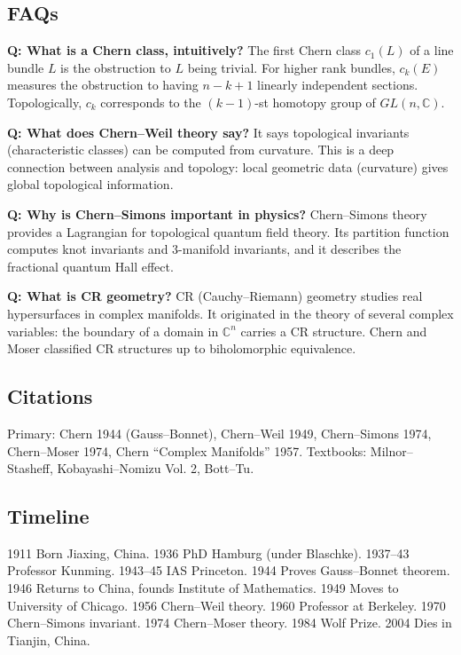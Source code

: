 \subsection*{FAQs}

\noindent\textbf{Q: What is a Chern class, intuitively?} The first Chern class $c_1(L)$ of a line bundle $L$ is the obstruction to $L$ being trivial. For higher rank bundles, $c_k(E)$ measures the obstruction to having $n-k+1$ linearly independent sections. Topologically, $c_k$ corresponds to the $(k-1)$-st homotopy group of $GL(n,\mathbb{C})$.

\noindent\textbf{Q: What does Chern--Weil theory say?} It says topological invariants (characteristic classes) can be computed from curvature. This is a deep connection between analysis and topology: local geometric data (curvature) gives global topological information.

\noindent\textbf{Q: Why is Chern--Simons important in physics?} Chern--Simons theory provides a Lagrangian for topological quantum field theory. Its partition function computes knot invariants and 3-manifold invariants, and it describes the fractional quantum Hall effect.

\noindent\textbf{Q: What is CR geometry?} CR (Cauchy--Riemann) geometry studies real hypersurfaces in complex manifolds. It originated in the theory of several complex variables: the boundary of a domain in $\mathbb{C}^n$ carries a CR structure. Chern and Moser classified CR structures up to biholomorphic equivalence.

\subsection*{Citations}

Primary: Chern 1944 (Gauss--Bonnet), Chern--Weil 1949, Chern--Simons 1974, Chern--Moser 1974, Chern ``Complex Manifolds'' 1957. Textbooks: Milnor--Stasheff, Kobayashi--Nomizu Vol. 2, Bott--Tu.

\subsection*{Timeline}

1911 Born Jiaxing, China. 1936 PhD Hamburg (under Blaschke). 1937--43 Professor Kunming. 1943--45 IAS Princeton. 1944 Proves Gauss--Bonnet theorem. 1946 Returns to China, founds Institute of Mathematics. 1949 Moves to University of Chicago. 1956 Chern--Weil theory. 1960 Professor at Berkeley. 1970 Chern--Simons invariant. 1974 Chern--Moser theory. 1984 Wolf Prize. 2004 Dies in Tianjin, China.

